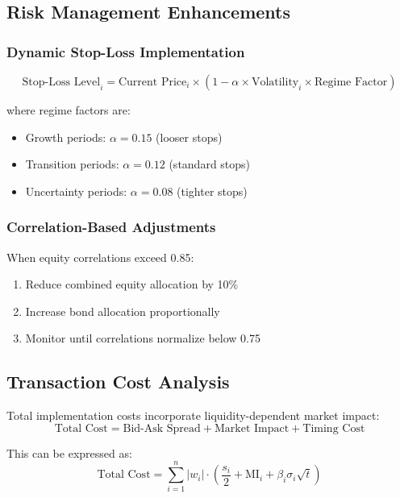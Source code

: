 \documentclass[onecolumn,ieee]{arithmaxresearch}
\begin{document}
\subsection{Risk Management Enhancements}

\subsubsection{Dynamic Stop-Loss Implementation}
\begin{equation}
\text{Stop-Loss Level}_i = \text{Current Price}_i \times (1 - \alpha \times \text{Volatility}_i \times \text{Regime Factor})
\end{equation}

where regime factors are:
\begin{itemize}
    \item Growth periods: $\alpha = 0.15$ (looser stops)
    \item Transition periods: $\alpha = 0.12$ (standard stops)
    \item Uncertainty periods: $\alpha = 0.08$ (tighter stops)
\end{itemize}

\subsubsection{Correlation-Based Adjustments}
When equity correlations exceed 0.85:
\begin{enumerate}
    \item Reduce combined equity allocation by 10\%
    \item Increase bond allocation proportionally
    \item Monitor until correlations normalize below 0.75
\end{enumerate}

\subsection{Transaction Cost Analysis}

Total implementation costs incorporate liquidity-dependent market impact:
\begin{equation}
\text{Total Cost} = \text{Bid-Ask Spread} + \text{Market Impact} + \text{Timing Cost}
\end{equation}

This can be expressed as:
\begin{equation}
\text{Total Cost} = \sum_{i=1}^n |w_i| \cdot \left(\frac{s_i}{2} + \text{MI}_i + \beta_i \sigma_i \sqrt{t}\right)
\end{equation}
\end{document}
